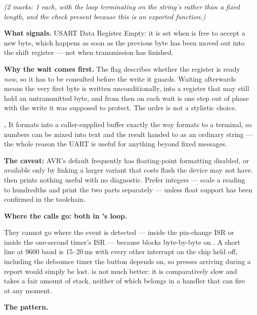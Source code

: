 {\itshape (2 marks: 1 each, with the loop terminating on the string's  rather than a
fixed length, and the  check present because this is an exported function.)\par}

\medskip \textbf{What  signals.} USART Data Register Empty: it is set when 
is free to accept a new byte, which happens as soon as the previous byte has been moved out into the
shift register --- not when transmission has finished. 

\textbf{Why the wait comes first.} The flag describes whether the register is ready \emph{now}, so
it has to be consulted before the write it guards. Waiting afterwards means the very first byte is
written unconditionally, into a register that may still hold an untransmitted byte, and from then on
each wait is one step out of phase with the write it was supposed to protect. The order is not a
stylistic choice. 

\textbf{.} It formats into a caller-supplied buffer exactly the way 
formats to a terminal, so numbers can be mixed into text and the result handed to
 as an ordinary string --- the whole reason the UART is useful for anything
beyond fixed messages.

\textbf{The caveat:} AVR's default  frequently has floating-point formatting
disabled, or available only by linking a larger variant that costs flash the device may not have.
 then prints nothing useful with no diagnostic. Prefer integers --- scale a reading to
hundredths and print the two parts separately --- unless float support has been confirmed in the
toolchain. 

\textbf{Where the calls go: both in 's loop.} 

They cannot go where the event is detected --- inside the pin-change ISR or inside the one-second
timer's ISR --- because  blocks byte-by-byte on . A short line at
9600 baud is 15--20\,ms with every other interrupt on the chip held off, including the debounce
timer the button depends on, so presses arriving during a report would simply be lost.
 is not much better: it is comparatively slow and takes a fair amount of stack,
neither of which belongs in a handler that can fire at any moment.

\textbf{The pattern.} 

